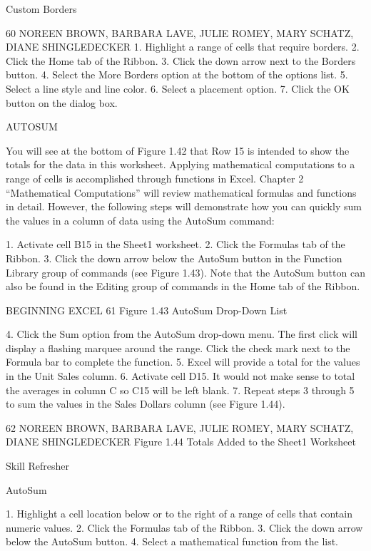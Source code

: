 Custom Borders




60 NOREEN BROWN, BARBARA LAVE, JULIE ROMEY, MARY SCHATZ, DIANE SHINGLEDECKER
1. Highlight a range of cells that require borders.
2. Click the Home tab of the Ribbon.
3. Click the down arrow next to the Borders button.
4. Select the More Borders option at the bottom of the options list.
5. Select a line style and line color.
6. Select a placement option.
7. Click the OK button on the dialog box.




AUTOSUM

You will see at the bottom of Figure 1.42 that Row 15 is intended to show the totals for the data
in this worksheet. Applying mathematical computations to a range of cells is accomplished
through functions in Excel. Chapter 2 “Mathematical Computations” will review mathematical
formulas and functions in detail. However, the following steps will demonstrate how you can quickly
sum the values in a column of data using the AutoSum command:

1. Activate cell B15 in the Sheet1 worksheet.
2. Click the Formulas tab of the Ribbon.
3. Click the down arrow below the AutoSum button in the Function Library group of commands
(see Figure 1.43). Note that the AutoSum button can also be found in the Editing group of
commands in the Home tab of the Ribbon.




BEGINNING EXCEL 61
Figure 1.43 AutoSum Drop-Down List




4. Click the Sum option from the AutoSum drop-down menu. The first click will display a flashing
marquee around the range. Click the check mark next to the Formula bar to complete the
function.
5. Excel will provide a total for the values in the Unit Sales column.
6. Activate cell D15. It would not make sense to total the averages in column C so C15 will be left
blank.
7. Repeat steps 3 through 5 to sum the values in the Sales Dollars column (see Figure 1.44).




62 NOREEN BROWN, BARBARA LAVE, JULIE ROMEY, MARY SCHATZ, DIANE SHINGLEDECKER
Figure 1.44 Totals Added to the Sheet1 Worksheet




Skill Refresher


AutoSum

1. Highlight a cell location below or to the right of a range of cells that contain numeric values.
2. Click the Formulas tab of the Ribbon.
3. Click the down arrow below the AutoSum button.
4. Select a mathematical function from the list.



